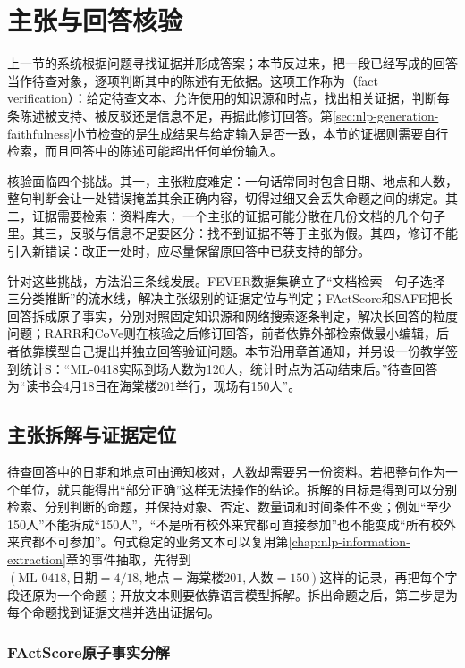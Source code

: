 \section{主张与回答核验}
\label{sec:nlp-dialogue-verification}

上一节的系统根据问题寻找证据并形成答案；本节反过来，把一段已经写成的回答当作待查对象，逐项判断其中的陈述有无依据。这项工作称为（fact verification）：给定待查文本、允许使用的知识源和时点，找出相关证据，判断每条陈述被支持、被反驳还是信息不足，再据此修订回答。第\ref{sec:nlp-generation-faithfulness}小节检查的是生成结果与给定输入是否一致，本节的证据则需要自行检索，而且回答中的陈述可能超出任何单份输入。

核验面临四个挑战。其一，主张粒度难定：一句话常同时包含日期、地点和人数，整句判断会让一处错误掩盖其余正确内容，切得过细又会丢失命题之间的绑定。其二，证据需要检索：资料库大，一个主张的证据可能分散在几份文档的几个句子里。其三，反驳与信息不足要区分：找不到证据不等于主张为假。其四，修订不能引入新错误：改正一处时，应尽量保留原回答中已获支持的部分。

针对这些挑战，方法沿三条线发展。FEVER数据集\cite{nlp-intro-thorne2018}确立了“文档检索—句子选择—三分类推断”的流水线，解决主张级别的证据定位与判定；FActScore和SAFE把长回答拆成原子事实，分别对照固定知识源和网络搜索逐条判定，解决长回答的粒度问题；RARR和CoVe则在核验之后修订回答，前者依靠外部检索做最小编辑，后者依靠模型自己提出并独立回答验证问题。本节沿用章首通知，并另设一份教学签到统计S：“ML-0418实际到场人数为120人，统计时点为活动结束后。”待查回答为“读书会4月18日在海棠楼201举行，现场有150人”。

\subsection{主张拆解与证据定位}
\label{sec:nlp-dialogue-claims}

待查回答中的日期和地点可由通知核对，人数却需要另一份资料。若把整句作为一个单位，就只能得出“部分正确”这样无法操作的结论。拆解的目标是得到可以分别检索、分别判断的命题，并保持对象、否定、数量词和时间条件不变；例如“至少150人”不能拆成“150人”，“不是所有校外来宾都可直接参加”也不能变成“所有校外来宾都不可参加”。句式稳定的业务文本可以复用第\ref{chap:nlp-information-extraction}章的事件抽取，先得到$(\text{ML-0418},\text{日期}=4/18,\text{地点}=\text{海棠楼201},\text{人数}=150)$这样的记录，再把每个字段还原为一个命题；开放文本则要依靠语言模型拆解。拆出命题之后，第二步是为每个命题找到证据文档并选出证据句。

\subsubsection{FActScore原子事实分解}
\label{sec:nlp-dialogue-factscore}

